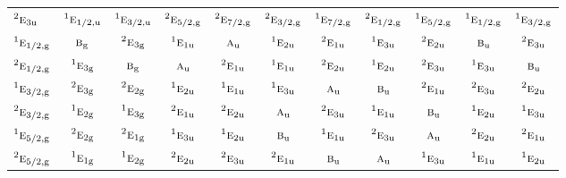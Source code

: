 \documentclass[10pt,a4paper]{article}
\numberwithin{equation}{section}
\newcommand{\irr}[1]{\text{\normalfont\scshape #1}}
\newcommand{\conjpair}[1]{{}^{#1}}
\newcommand{\ptag}[1]{\mathrm{#1}}
\begin{document}
{\begin{longtable}{@{}lcccccccccc@{}}
$\conjpair{2}\irr{e}_{3\ptag{u}}$ & $\conjpair{1}\irr{e}_{1/2,\ptag{u}}$ & $\conjpair{1}\irr{e}_{3/2,\ptag{u}}$ & $\conjpair{2}\irr{e}_{5/2,\ptag{g}}$ & $\conjpair{2}\irr{e}_{7/2,\ptag{g}}$ & $\conjpair{2}\irr{e}_{3/2,\ptag{g}}$ & $\conjpair{1}\irr{e}_{7/2,\ptag{g}}$ & $\conjpair{2}\irr{e}_{1/2,\ptag{g}}$ & $\conjpair{1}\irr{e}_{5/2,\ptag{g}}$ & $\conjpair{1}\irr{e}_{1/2,\ptag{g}}$ & $\conjpair{1}\irr{e}_{3/2,\ptag{g}}$\\
$\conjpair{1}\irr{e}_{1/2,\ptag{g}}$ & $\irr{b}_{\ptag{g}}$ & $\conjpair{2}\irr{e}_{3\ptag{g}}$ & $\conjpair{1}\irr{e}_{1\ptag{u}}$ & $\irr{a}_{\ptag{u}}$ & $\conjpair{1}\irr{e}_{2\ptag{u}}$ & $\conjpair{2}\irr{e}_{1\ptag{u}}$ & $\conjpair{1}\irr{e}_{3\ptag{u}}$ & $\conjpair{2}\irr{e}_{2\ptag{u}}$ & $\irr{b}_{\ptag{u}}$ & $\conjpair{2}\irr{e}_{3\ptag{u}}$\\
$\conjpair{2}\irr{e}_{1/2,\ptag{g}}$ & $\conjpair{1}\irr{e}_{3\ptag{g}}$ & $\irr{b}_{\ptag{g}}$ & $\irr{a}_{\ptag{u}}$ & $\conjpair{2}\irr{e}_{1\ptag{u}}$ & $\conjpair{1}\irr{e}_{1\ptag{u}}$ & $\conjpair{2}\irr{e}_{2\ptag{u}}$ & $\conjpair{1}\irr{e}_{2\ptag{u}}$ & $\conjpair{2}\irr{e}_{3\ptag{u}}$ & $\conjpair{1}\irr{e}_{3\ptag{u}}$ & $\irr{b}_{\ptag{u}}$\\
$\conjpair{1}\irr{e}_{3/2,\ptag{g}}$ & $\conjpair{2}\irr{e}_{3\ptag{g}}$ & $\conjpair{2}\irr{e}_{2\ptag{g}}$ & $\conjpair{1}\irr{e}_{2\ptag{u}}$ & $\conjpair{1}\irr{e}_{1\ptag{u}}$ & $\conjpair{1}\irr{e}_{3\ptag{u}}$ & $\irr{a}_{\ptag{u}}$ & $\irr{b}_{\ptag{u}}$ & $\conjpair{2}\irr{e}_{1\ptag{u}}$ & $\conjpair{2}\irr{e}_{3\ptag{u}}$ & $\conjpair{2}\irr{e}_{2\ptag{u}}$\\
$\conjpair{2}\irr{e}_{3/2,\ptag{g}}$ & $\conjpair{1}\irr{e}_{2\ptag{g}}$ & $\conjpair{1}\irr{e}_{3\ptag{g}}$ & $\conjpair{2}\irr{e}_{1\ptag{u}}$ & $\conjpair{2}\irr{e}_{2\ptag{u}}$ & $\irr{a}_{\ptag{u}}$ & $\conjpair{2}\irr{e}_{3\ptag{u}}$ & $\conjpair{1}\irr{e}_{1\ptag{u}}$ & $\irr{b}_{\ptag{u}}$ & $\conjpair{1}\irr{e}_{2\ptag{u}}$ & $\conjpair{1}\irr{e}_{3\ptag{u}}$\\
$\conjpair{1}\irr{e}_{5/2,\ptag{g}}$ & $\conjpair{2}\irr{e}_{2\ptag{g}}$ & $\conjpair{2}\irr{e}_{1\ptag{g}}$ & $\conjpair{1}\irr{e}_{3\ptag{u}}$ & $\conjpair{1}\irr{e}_{2\ptag{u}}$ & $\irr{b}_{\ptag{u}}$ & $\conjpair{1}\irr{e}_{1\ptag{u}}$ & $\conjpair{2}\irr{e}_{3\ptag{u}}$ & $\irr{a}_{\ptag{u}}$ & $\conjpair{2}\irr{e}_{2\ptag{u}}$ & $\conjpair{2}\irr{e}_{1\ptag{u}}$\\
$\conjpair{2}\irr{e}_{5/2,\ptag{g}}$ & $\conjpair{1}\irr{e}_{1\ptag{g}}$ & $\conjpair{1}\irr{e}_{2\ptag{g}}$ & $\conjpair{2}\irr{e}_{2\ptag{u}}$ & $\conjpair{2}\irr{e}_{3\ptag{u}}$ & $\conjpair{2}\irr{e}_{1\ptag{u}}$ & $\irr{b}_{\ptag{u}}$ & $\irr{a}_{\ptag{u}}$ & $\conjpair{1}\irr{e}_{3\ptag{u}}$ & $\conjpair{1}\irr{e}_{1\ptag{u}}$ & $\conjpair{1}\irr{e}_{2\ptag{u}}$\\

\end{longtable}}
\end{document}
